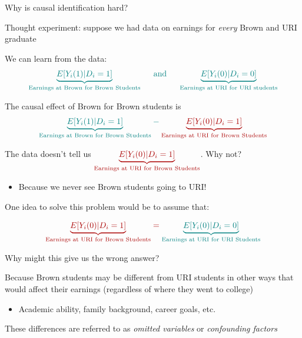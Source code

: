\documentclass[11pt,english,handout]{beamer}
\newenvironment{wideitemize}{\itemize\addtolength{\itemsep}{10pt}}{\enditemize}
\begin{document}
\begin{frame}{Why is causal identification hard?}
	
	\begin{wideitemize}
		
		\item
		Thought experiment: suppose we had data on earnings for \textit{every} Brown and URI graduate
		
		
		\item
		We can learn from the data:
		$$\color{teal} \underbrace{E[ Y_i(1) | D_i=1  ] }_{\text{Earnings at Brown for Brown Students}} \hspace{0.5cm}  \text{and} \hspace{0.5cm} \underbrace{E[Y_i(0) | D_i = 0]	}_{\text{Earnings at URI for URI students}}$$
		
		\pause 
		\item
		The causal effect of Brown for Brown students is 
		$$ \color{teal}{\underbrace{E[ Y_i(1) | D_i=1  ] }_{\text{Earnings at Brown for Brown Students}}} - \color{red}{ \underbrace{E[ Y_i(0) | D_i=1  ] }_{\text{Earnings at URI for Brown Students}}}$$ 
		
		\pause 
		\item
		The data doesn't tell us $\color{red}{ \underbrace{E[ Y_i(0) | D_i=1 ] }_{\text{Earnings at URI for Brown Students}}}$. Why not? 
		\pause
			\begin{itemize}
				\item 
				Because we never see Brown students going to URI!
			\end{itemize} 
		
	\end{wideitemize}
	
\end{frame}


\begin{frame}
	\begin{wideitemize}
		\item
		One idea to solve this problem would be to assume that: 
		
		$$ \color{red}{ \underbrace{E[ Y_i(0) | D_i=1  ] }_{\text{Earnings at URI for Brown Students}}} = \color{teal}{ \underbrace{E[ Y_i(0) | D_i=0 ] }_{\text{Earnings at URI for URI Students}}}$$
		
		\item
		Why might this give us the wrong answer? 
		
		\pause
		
		\item
		Because Brown students may be different from URI students in other ways that would affect their earnings (regardless of where they went to college)
		
			\begin{itemize}
				\item 
				Academic ability, family background, career goals, etc.
			\end{itemize}
		
		\item
		These differences are referred to as \textit{omitted variables} or \textit{confounding factors}
	\end{wideitemize}
\end{frame}
\end{document}
